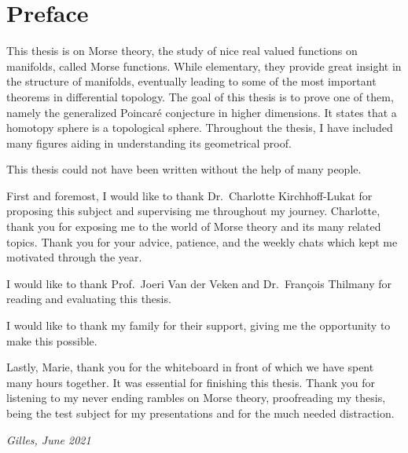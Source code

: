 \chapter*{Preface}
\label{ch:preface}

This thesis is on Morse theory,
the study of nice real valued functions on manifolds,
called Morse functions.
While elementary, they provide great insight in the structure of manifolds, eventually leading to some of the most important theorems in differential topology.
The goal of this thesis is to prove one of them, namely the generalized Poincaré conjecture in higher dimensions.
It states that a homotopy sphere is a topological sphere.
Throughout the thesis, I have included many figures aiding in understanding its geometrical proof.

This thesis could not have been written without the help of many people.

First and foremost, I would like to thank Dr.~Charlotte Kirchhoff-Lukat for proposing this subject and supervising me throughout my journey.
Charlotte, thank you for exposing me to the world of Morse theory and its many related topics.
Thank you for your advice, patience, and the weekly chats which kept me motivated through the year.

I would like to thank Prof.~Joeri Van der Veken and Dr.~François Thilmany for reading and evaluating this thesis.

I would like to thank my family for their support, giving me the opportunity to make this possible.

Lastly, Marie, thank you for the whiteboard in front of which we have spent many hours together.
It was essential for finishing this thesis.
Thank you for listening to my never ending rambles on Morse theory, proofreading my thesis, being the test subject for my presentations and for the much needed distraction.

\hfill \emph{Gilles, June 2021}
